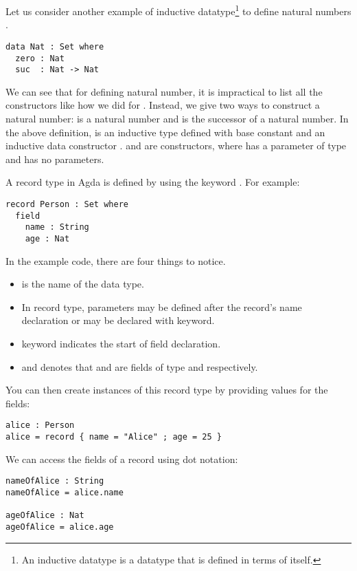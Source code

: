 Let us consider another example of inductive datatype\footnote{An inductive
datatype is a datatype that is defined in terms of itself.} to define natural
numbers . 

\begin{verbatim}
data Nat : Set where
  zero : Nat
  suc  : Nat -> Nat
\end{verbatim}
\label{code:Nat}

We can see that for defining natural number, it is impractical to list all the
constructors like how we did for . Instead, we give two ways to
construct a natural number:  is a natural number and 
is the successor of a natural number. In the above definition,  is
an inductive type defined with base constant  and an inductive data
constructor .  and  are constructors, where
 has a parameter of type  and  has no
parameters. 

A record type in Agda is defined by using the keyword . For
example:

\begin{verbatim}
record Person : Set where
  field
    name : String
    age : Nat
\end{verbatim}

In the example code, there are four things to notice.
\begin{itemize}
  \item {} is the name of the data type.
  \item In record type, parameters may be defined after the record's name
  declaration or may be declared with  keyword.
  \item {} keyword indicates the start of field declaration.
  \item {} and  denotes that 
  and  are fields of type  and 
  respectively.
\end{itemize}

You can then create instances of this record type by providing values for the
fields:

\begin{verbatim}
alice : Person
alice = record { name = "Alice" ; age = 25 }
\end{verbatim}

We can access the fields of a record using dot notation:
\begin{verbatim}
nameOfAlice : String
nameOfAlice = alice.name

ageOfAlice : Nat
ageOfAlice = alice.age
\end{verbatim}

